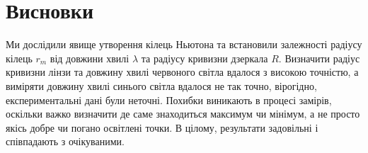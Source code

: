 \section{Висновки}
\qquad Ми дослідили явище утворення кілець Ньютона та встановили залежності радіусу кілець $r_m$ від довжини хвилі $\lambda$ та радіусу кривизни дзеркала $R$. Визначити радіус кривизни лінзи та довжину хвилі червоного світла вдалося з високою точністю, а виміряти довжину хвилі синього світла вдалося не так точно, вірогідно, експериментальні дані були неточні. Похибки виникають в процесі замірів, оскільки важко визначити де саме знаходиться максимум чи мінімум, а не просто якісь добре чи погано освітлені точки. В цілому, результати задовільні і співпадають з очікуваними.
